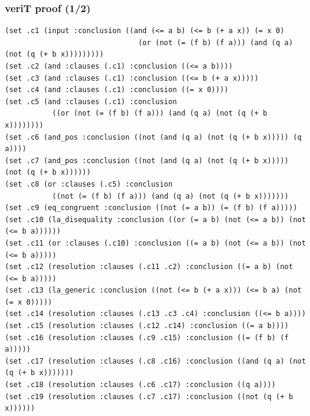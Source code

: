 \documentclass[svgnames,table,mathserif]{beamer}
\begin{document}
\begin{frame}[fragile]
\frametitle{veriT proof (1/2)}

{\tiny
\begin{verbatim}
(set .c1 (input :conclusion ((and (<= a b) (<= b (+ a x)) (= x 0)
                               (or (not (= (f b) (f a))) (and (q a) (not (q (+ b x)))))))))
(set .c2 (and :clauses (.c1) :conclusion ((<= a b))))
(set .c3 (and :clauses (.c1) :conclusion ((<= b (+ a x)))))
(set .c4 (and :clauses (.c1) :conclusion ((= x 0))))
(set .c5 (and :clauses (.c1) :conclusion
           ((or (not (= (f b) (f a))) (and (q a) (not (q (+ b x))))))))
(set .c6 (and_pos :conclusion ((not (and (q a) (not (q (+ b x))))) (q a))))
(set .c7 (and_pos :conclusion ((not (and (q a) (not (q (+ b x))))) (not (q (+ b x))))))
(set .c8 (or :clauses (.c5) :conclusion
           ((not (= (f b) (f a))) (and (q a) (not (q (+ b x)))))))
(set .c9 (eq_congruent :conclusion ((not (= a b)) (= (f b) (f a)))))
(set .c10 (la_disequality :conclusion ((or (= a b) (not (<= a b)) (not (<= b a))))))
(set .c11 (or :clauses (.c10) :conclusion ((= a b) (not (<= a b)) (not (<= b a)))))
(set .c12 (resolution :clauses (.c11 .c2) :conclusion ((= a b) (not (<= b a)))))
(set .c13 (la_generic :conclusion ((not (<= b (+ a x))) (<= b a) (not (= x 0)))))
(set .c14 (resolution :clauses (.c13 .c3 .c4) :conclusion ((<= b a))))
(set .c15 (resolution :clauses (.c12 .c14) :conclusion ((= a b))))
(set .c16 (resolution :clauses (.c9 .c15) :conclusion ((= (f b) (f a)))))
(set .c17 (resolution :clauses (.c8 .c16) :conclusion ((and (q a) (not (q (+ b x)))))))
(set .c18 (resolution :clauses (.c6 .c17) :conclusion ((q a))))
(set .c19 (resolution :clauses (.c7 .c17) :conclusion ((not (q (+ b x))))))
\end{verbatim}
}

\end{frame}
\end{document}
